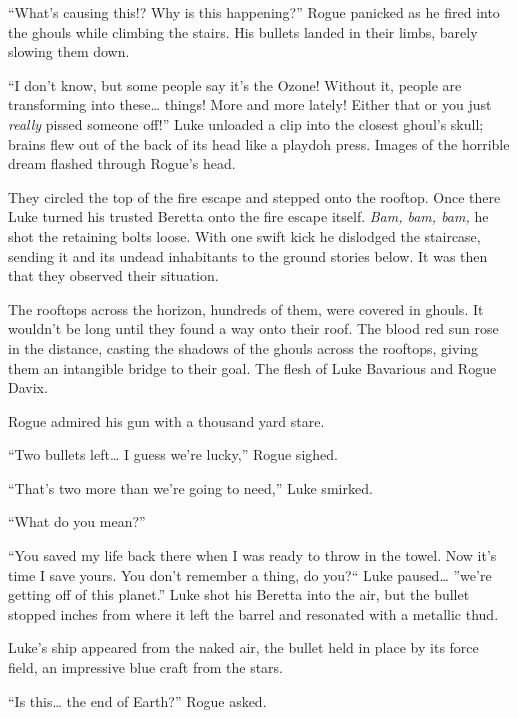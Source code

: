 ``What's causing this!? Why is this happening?''
Rogue panicked as he fired into the ghouls while climbing the
stairs. His bullets landed in their limbs, barely slowing them
down.



``I don't know, but some people say it's the
Ozone! Without it, people are transforming into these{\ldots}
things! More and more lately! Either that or you just {\em really}
pissed someone off!'' Luke unloaded a clip into the closest
ghoul's skull; brains flew out of the back of its head like a
playdoh press. Images of the horrible dream flashed through
Rogue's head.



They circled the top of the fire escape and stepped onto the
rooftop. Once there Luke turned his trusted Beretta onto the fire
escape itself. {\em Bam, bam, bam,} he shot the retaining bolts
loose. With one swift kick he dislodged the staircase, sending it
and its undead inhabitants to the ground stories below. It was then
that they observed their situation.



The rooftops across the horizon, hundreds of them, were covered in
ghouls. It wouldn't be long until they found a way onto their
roof. The blood red sun rose in the distance, casting the shadows
of the ghouls across the rooftops, giving them an intangible bridge
to their goal. The flesh of Luke Bavarious and Rogue Davix.

Rogue admired his gun with a thousand yard stare.



``Two bullets left{\ldots} I guess we're lucky,'' Rogue
sighed.

``That's two more than we're going to need,''
Luke smirked.

``What do you mean?''

``You saved my life back there when I was ready to throw in
the towel. Now it's time I save yours. You don't remember a thing,
do you?`` Luke paused{\ldots} ''we're getting off of this
planet.'' Luke shot his Beretta into the air, but the bullet
stopped inches from where it left the barrel and resonated with a
metallic thud.



Luke's ship appeared from the naked air, the bullet held in
place by its force field, an impressive blue craft from the
stars.



``Is this{\ldots} the end of Earth?'' Rogue asked.

